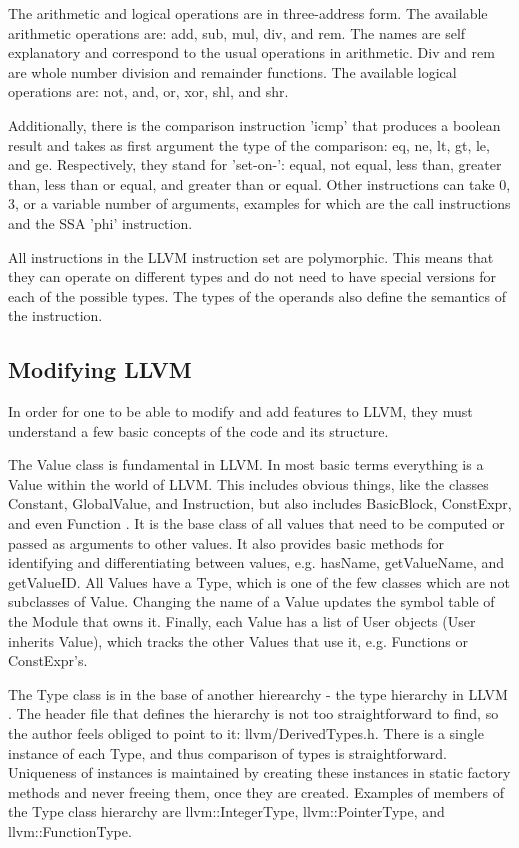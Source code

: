 \documentclass[parskip]{cs4rep}
\begin{document}
The arithmetic and logical operations are in three-address form. The available arithmetic operations are: add, sub, mul, div, and rem. The names are self explanatory and correspond to the usual operations in arithmetic. Div and rem are whole number division and remainder functions. The available logical operations are: not, and, or, xor, shl, and shr.

Additionally, there is the comparison instruction 'icmp' that produces a boolean result and takes as first argument the type of the comparison: eq, ne, lt, gt, le, and ge. Respectively, they stand for 'set-on-': equal, not equal, less than, greater than, less than or equal, and greater than or equal. Other instructions can take 0, 3, or a variable number of arguments, examples for which are the call instructions and the SSA 'phi' instruction.

All instructions in the LLVM instruction set are polymorphic. This means that they can operate on different types and do not need to have special versions for each of the possible types. The types of the operands also define the semantics of the instruction.

\subsection{Modifying LLVM}

In order for one to be able to modify and add features to LLVM, they must understand a few basic concepts of the code and its structure.

The Value class is fundamental in LLVM. In most basic terms everything is a Value within the world of LLVM. This includes obvious things, like the classes Constant, GlobalValue, and Instruction, but also includes BasicBlock, ConstExpr, and even Function \cite{P9}. It is the base class of all values that need to be computed or passed as arguments to other values. It also provides basic methods for identifying and differentiating between values, e.g. hasName, getValueName, and getValueID. All Values have a Type, which is one of the few classes which are not subclasses of Value. Changing the name of a Value updates the symbol table of the Module that owns it. Finally, each Value has a list of User objects (User inherits Value), which tracks the other Values that use it, e.g. Functions or ConstExpr's.

The Type class is in the base of another hierearchy - the type hierarchy in LLVM \cite{P10}. The header file that defines the hierarchy is not too straightforward to find, so the author feels obliged to point to it: llvm/DerivedTypes.h. There is a single instance of each Type, and thus comparison of types is straightforward. Uniqueness of instances is maintained by creating these instances in static factory methods and never freeing them, once they are created. Examples of members of the Type class hierarchy are llvm::IntegerType, llvm::PointerType, and llvm::FunctionType.
\end{document}
